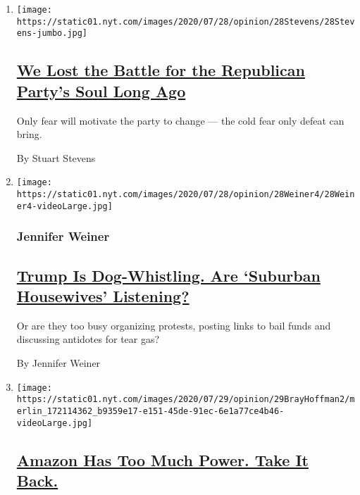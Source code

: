 \begin{enumerate}
\def\labelenumi{\arabic{enumi}.}
\item
  \texttt{[image: https://static01.nyt.com/images/2020/07/28/opinion/28Stevens/28Stevens-jumbo.jpg]}

  \hypertarget{we-lost-the-battle-for-the-republican-partys-soul-long-ago}{%
  \subsection{\texorpdfstring{\href{/2020/07/29/opinion/trump-republican-party-racism.html}{We
  Lost the Battle for the Republican Party's Soul Long
  Ago}}{We Lost the Battle for the Republican Party's Soul Long Ago}}\label{we-lost-the-battle-for-the-republican-partys-soul-long-ago}}

  Only fear will motivate the party to change --- the cold fear only
  defeat can bring.

  By Stuart Stevens
\item
  \texttt{[image: https://static01.nyt.com/images/2020/07/28/opinion/28Weiner4/28Weiner4-videoLarge.jpg]}

  \hypertarget{jennifer-weiner}{%
  \subsubsection{Jennifer Weiner}\label{jennifer-weiner}}

  \hypertarget{trump-is-dog-whistling-are-suburban-housewives-listening}{%
  \subsection{\texorpdfstring{\href{/2020/07/28/opinion/trump-white-women.html}{Trump
  Is Dog-Whistling. Are `Suburban Housewives'
  Listening?}}{Trump Is Dog-Whistling. Are `Suburban Housewives' Listening?}}\label{trump-is-dog-whistling-are-suburban-housewives-listening}}

  Or are they too busy organizing protests, posting links to bail funds
  and discussing antidotes for tear gas?

  By Jennifer Weiner
\item
  \texttt{[image: https://static01.nyt.com/images/2020/07/29/opinion/29BrayHoffman2/merlin\_172114362\_b9359e17-e151-45de-91ec-6e1a77ce4b46-videoLarge.jpg]}

  \hypertarget{amazon-has-too-much-power-take-it-back}{%
  \subsection{\texorpdfstring{\href{/2020/07/29/opinion/amazon-union-congress-antitrust.html}{Amazon
  Has Too Much Power. Take It
  Back.}}{Amazon Has Too Much Power. Take It Back.}}\label{amazon-has-too-much-power-take-it-back}}


\end{enumerate}
